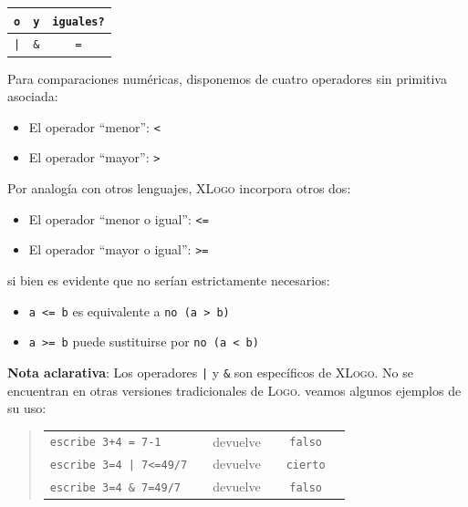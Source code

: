 \begin{center} \begin{tabular}{|*{3}{c|}} \hline 
   \texttt{o} \index{o@\texttt{o}} &
      \texttt{y} \index{y@\texttt{y}} &
         \texttt{iguales?} \index{iguales?@\texttt{iguales?}} \\ \hline
   \texttt{|}& \texttt{\&}& \texttt{=} \\ \hline
\end{tabular}\end{center}

\noindent Para comparaciones num\'ericas, disponemos de cuatro operadores sin
primitiva asociada:
\begin{itemize}
   \item El operador ``menor'': \texttt{<}
   \item El operador ``mayor'': \texttt{>}
\end{itemize}
Por analog\'ia con otros lenguajes, \textsc{XLogo} incorpora otros dos:
\begin{itemize}
   \item El operador ``menor o igual'': \texttt{<=}
   \item El operador ``mayor o igual'': \texttt{>=}
\end{itemize}
si bien es evidente que no ser\'ian estrictamente necesarios:
\begin{itemize}
   \item \texttt{a <= b} es equivalente a \texttt{no (a > b)} 
   \item \texttt{a >= b} puede sustituirse por \texttt{no (a < b)}
\end{itemize}

\textbf{Nota aclarativa}: Los operadores \texttt{|} y \texttt{\&} son
espec\'ificos de \textsc{XLogo}.
No se encuentran en otras versiones tradicionales de \textsc{Logo}.
veamos algunos ejemplos de su uso:
\begin{quote} \begin{tabular}{lccccl}
   \texttt{escribe 3+4 = 7-1}      & & devuelve & & \texttt{falso} \\
   \texttt{escribe 3=4 | 7<=49/7}  & & devuelve & & \texttt{cierto} \\
   \texttt{escribe 3=4 \& 7=49/7}  & & devuelve & & \texttt{falso}
\end{tabular} \end{quote}

